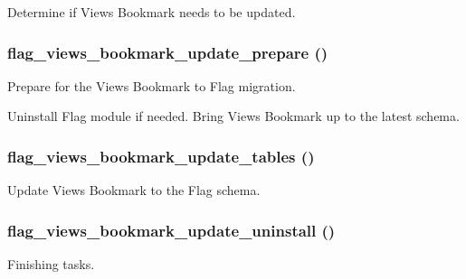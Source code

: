Determine if Views Bookmark needs to be updated. \hypertarget{flag_8views__bookmark_8inc_704c0e040a36590d94bb0bc590f6b66b}{
\subsubsection[{flag\_\-views\_\-bookmark\_\-update\_\-prepare}]{\setlength{\rightskip}{0pt plus 5cm}flag\_\-views\_\-bookmark\_\-update\_\-prepare ()}}
\label{flag_8views__bookmark_8inc_704c0e040a36590d94bb0bc590f6b66b}


Prepare for the Views Bookmark to Flag migration.

Uninstall Flag module if needed. Bring Views Bookmark up to the latest schema. \hypertarget{flag_8views__bookmark_8inc_e8493a9a414b2bef1c9424ef50c2f156}{
\subsubsection[{flag\_\-views\_\-bookmark\_\-update\_\-tables}]{\setlength{\rightskip}{0pt plus 5cm}flag\_\-views\_\-bookmark\_\-update\_\-tables ()}}
\label{flag_8views__bookmark_8inc_e8493a9a414b2bef1c9424ef50c2f156}


Update Views Bookmark to the Flag schema. \hypertarget{flag_8views__bookmark_8inc_7a09022a28d65c81520220f3cd778ba3}{
\subsubsection[{flag\_\-views\_\-bookmark\_\-update\_\-uninstall}]{\setlength{\rightskip}{0pt plus 5cm}flag\_\-views\_\-bookmark\_\-update\_\-uninstall ()}}
\label{flag_8views__bookmark_8inc_7a09022a28d65c81520220f3cd778ba3}


Finishing tasks. 